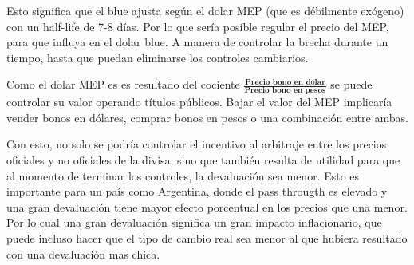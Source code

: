 \documentclass[11pt,a4paper]{article}
\begin{document}
\begin{table}[H]
\centering
{}
\caption{VECM entre dólar MEP y dólar blue (variables en logaritmos)}
\end{table}

Esto significa que el blue ajusta según el dolar MEP (que es débilmente exógeno) con un half-life de 7-8 días. 
Por lo que sería posible regular el precio del MEP, para que influya en el dolar blue. A manera de controlar la brecha durante un tiempo, hasta que puedan eliminarse los controles cambiarios.

Como el dolar MEP es es resultado del cociente $\frac{\textbf{Precio bono en dólar}}{\textbf{Precio bono en pesos}} $ se puede controlar su valor operando títulos públicos. Bajar el valor del MEP implicaría vender bonos en dólares, comprar bonos en pesos o una combinación entre ambas.

Con esto, no solo se podría controlar el incentivo al arbitraje entre los precios oficiales y no oficiales de la divisa; sino que también resulta de utilidad para que al momento de terminar los controles, la devaluación sea menor. Esto es importante para un país como Argentina, donde el pass througth es elevado y una gran devaluación tiene mayor efecto porcentual en los precios que una menor. Por lo cual una gran devaluación significa un gran impacto inflacionario, que puede incluso hacer que el tipo de cambio real sea menor al que hubiera resultado con una devaluación mas chica. 
 
\end{document}
